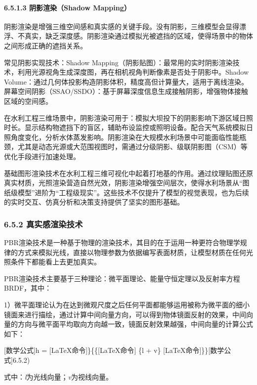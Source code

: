 \paragraph{6.5.1.3 阴影渲染（Shadow Mapping）}\label{ux9634ux5f71ux6e32ux67d3shadow-mapping}

阴影渲染是增强三维空间感和真实感的关键手段。没有阴影，三维模型会显得漂浮、不真实，缺乏深度感。阴影渲染通过模拟光被遮挡的区域，使得场景中的物体之间形成正确的遮挡关系。

常见阴影实现技术：Shadow Mapping（阴影贴图）：最常用的实时阴影渲染技术，利用光源视角生成深度图，再在相机视角判断像素是否处于阴影中。Shadow Volume：通过几何体投影构造阴影体积，精度高但计算量大，适用于离线渲染。屏幕空间阴影（SSAO/SSDO）：基于屏幕深度信息生成接触阴影，增强物体接触区域的空间感。

在水利工程三维场景中，阴影渲染可用于：模拟大坝投下的阴影影响下游区域日照时长。显示结构物遮挡下的盲区，辅助布设监控或照明设备。配合天气系统模拟日照角度变化，分析水体蒸发影响。阴影渲染在大规模水利场景中可能面临性能瓶颈，尤其是动态光源或大范围视图时，需通过分级阴影、级联阴影图（CSM）等优化手段进行加速处理。

基础图形渲染技术在水利工程三维可视化中起着打地基的作用。通过纹理贴图还原真实材质，光照渲染营造自然光效，阴影渲染增强空间层次，使得水利场景从``图纸级模型''进阶为``工程级现实''。这些技术不仅提升了模型的视觉表现，也为后续的实时交互、仿真分析和决策支持提供了坚实的图形基础。

\subsubsection{6.5.2 真实感渲染技术}\label{ux771fux5b9eux611fux6e32ux67d3ux6280ux672f}

PBR渲染技术是一种基于物理的渲染技术，其目的在于运用一种更符合物理学规律的方式来模拟光线，直接以物理参数为依据编写表面材质，让模型材质在任何光照条件下都能看上去更加真实。

PBR渲染技术主要基于三种理论：微平面理论、能量守恒定理以及反射率方程BRDF，其中：

1）微平面理论认为在达到微观尺度之后任何平面都能够运用被称为微平面的细小镜面来进行描绘，通过计算中间向量方向，可以得到物体镜面反射的效果，中间向量的方向与微平面平均取向方向越一致，镜面反射效果越强，中间向量的计算公式如下：

{[}数学公式{]}h = {[}LaTeX命令{]}\}\{\{{[}LaTeX命令{]}\textbar{} \{l + v\} {[}LaTeX命令{]}\textbar\}\}{[}数学公式{]}6.5.2)

式中：\emph{l}为光线向量；\emph{v}为视线向量。


